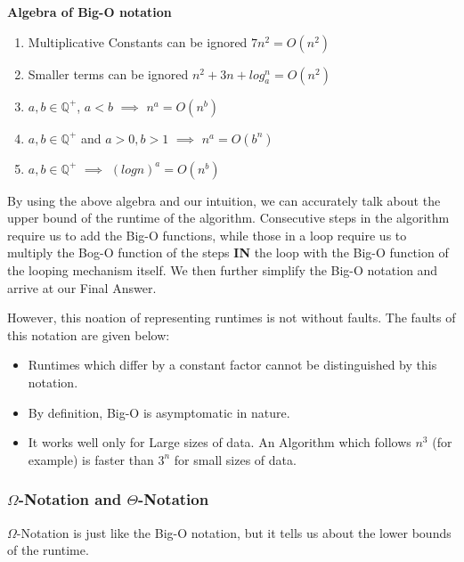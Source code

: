 \documentclass{article}
\theoremstyle{definition}
\theoremstyle{example}
\begin{document}
\noindent \textbf{Algebra of Big-O notation}
\begin{enumerate}
    \item Multiplicative Constants can be ignored \newline
            $7n^2 = O(n^2)$
    \item Smaller terms can be ignored \newline
            $n^2 + 3n + log_a^n = O(n^2)$
    \item $a,b \in \mathbb{Q}^+$, $a < b$ $\implies$ $n^a = O(n^b)$
    \item $a,b \in \mathbb{Q}^+$ and $a > 0, b > 1$ $\implies$ $n^a = O(b^n)$
    \item $a,b \in \mathbb{Q}^+$ $\implies$ $(logn)^a = O(n^b)$
\end{enumerate}

By using the above algebra and our intuition, we can accurately talk about the upper bound of the runtime of the algorithm. Consecutive steps in the algorithm require us to add the Big-O functions, while those in a loop require us to multiply the Bog-O function of the steps \textbf{IN} the loop with the Big-O function of the looping mechanism itself. We then further simplify the Big-O notation and arrive at our Final Answer.\par
\vspace{5mm}
However, this noation of representing runtimes is not without faults. The faults of this notation are given below:
\begin{itemize}
    \item Runtimes which differ by a constant factor cannot be distinguished by this notation.
    \item By definition, Big-O is asymptomatic in nature.
    \item It works well only for Large sizes of data. An Algorithm which follows $n^3$ (for example) is faster than $3^n$ for small sizes of data. 
\end{itemize}

\subsubsection{\Large $\Omega$-Notation and $\Theta$-Notation}

\hspace{6mm}$\Omega$-Notation is just like the Big-O notation, but it tells us about the lower bounds of the runtime.
\end{document}
